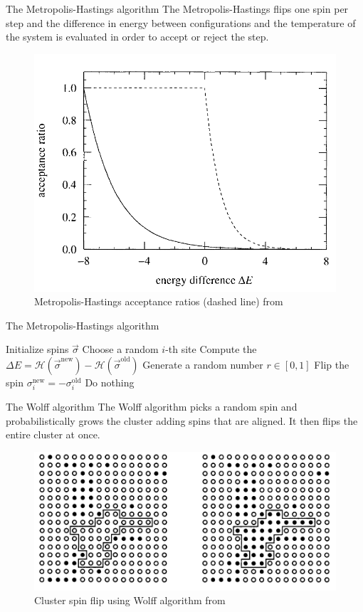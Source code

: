 \documentclass[handout]{beamer}
\begin{document}
\begin{frame}{The Metropolis-Hastings algorithm}
    The \alert{Metropolis-Hastings} flips one spin per step and the difference
    in energy between configurations and the temperature of the system is
    evaluated in order to accept or reject the step. \cite[46]{newman_barkema}

    \begin{figure}
        \centering
        \includegraphics[width=.4\textwidth]{metropolis_acceptance.png}
        \caption{Metropolis-Hastings acceptance ratios (dashed line) from
        \cite[48]{newman_barkema}}
    \end{figure}
\end{frame}

\begin{frame}{The Metropolis-Hastings algorithm}
    \begin{algorithm}[H]
        \begin{algorithmic}[1]
            \STATE Initialize spins $\vec \sigma$
                \STATE Choose a random $i$-th site
                \STATE Compute the $\Delta E =
                    \mathcal{H}(\vec\sigma^{\text{new}}) -
                    \mathcal{H}(\vec\sigma^{\text{old}})$
                \STATE Generate a random number $r\in [0,1]$
                \STATE Flip the spin $\sigma_i^{\text{new}} =
                -\sigma_i^{\text{old}}$
                \ELSE
                    \STATE Do nothing
                \ENDIF
            \ENDWHILE
        \end{algorithmic}
        \caption{Metropolis-Hastings algorithm}
        \label{algo:metropolis}
    \end{algorithm}
\end{frame}

\begin{frame}{The Wolff algorithm}
    The \alert{Wolff algorithm} picks a random spin and probabilistically grows
    the cluster adding spins that are aligned. It then flips the entire cluster
    at once. \cite[91]{newman_barkema}

    \begin{figure}
        \centering
        \includegraphics[width=.4\textwidth]{wolff.png}
        \caption{Cluster spin flip using Wolff algorithm from
        \cite[91]{newman_barkema}}
    \end{figure}
\end{frame}
\end{document}
